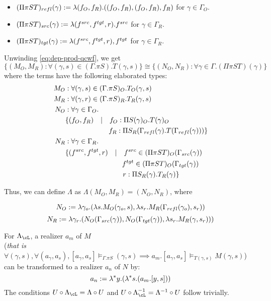 \documentclass[12pt,a4paper]{article}
\def\src{_{src}}
\def\rfl{_{refl}}
\def\tgt{_{tgt}}
\renewcommand{\O}{_{O}}\alwaysmath{O}
\newcommand{\R}{\ensuremath{_{R}}}
\begin{document}
\begin{itemize}
    \item $(\Pi \pi S T)\rfl(\gamma) \define \lambda (f\O, f\R). ((f\O, f\R), (f\O, f\R), f\R) $ for $\gamma \in \Gamma\O$.
    
    \item $(\Pi \pi S T)\src(\gamma) \define \lambda (f^{src}, f^{tgt}, r). f^{src}$ for $\gamma \in \Gamma\R$.
    
    \item $(\Pi \pi S T)\tgt(\gamma) \define \lambda (f^{src}, f^{tgt}, r), f^{tgt}$ for $\gamma \in \Gamma\R$.
\end{itemize}

Unwinding \cref{eq:dep-prod-qcwf}, we get  
$$\{(M\O,M\R) : \forall (\gamma, s) \in (\Gamma. \pi S) . T(\gamma, s) \} \cong \{(N\O, N\R) : \forall \gamma \in \Gamma . (\Pi \pi S T)(\gamma)\}$$
where the terms have the following elaborated types:
\begin{align*}
  M\O &: \forall (\gamma, s) \in (\Gamma. \pi S)\O . T\O(\gamma, s) \\
  M\R &: \forall (\gamma, r) \in (\Gamma. \pi S)\R . T\R(\gamma, s) \\
  N\O &: \forall \gamma \in \Gamma\O .\\
  &\{ (f\O , f\R) \quad|\quad f\O : \Pi S(\gamma)\O.T(\gamma)\O\\
  &\hspace{6.2em}  f\R : \Pi S\R (\Gamma\rfl(\gamma).T(\Gamma\rfl(\gamma))) \} \\
  N\R &: \forall \gamma \in \Gamma\R.\\
  &\{ (f^{src}, f^{tgt} , r) \quad|\quad  f^{src} \in (\Pi \pi S T)\O(\Gamma\src(\gamma))\\
  &\hspace{8.1em}   f^{tgt} \in (\Pi \pi S T)\O(\Gamma\tgt(\gamma))\\
  &\hspace{8.2em}   r : \Pi S\R (\gamma).T\R(\gamma)\}
\end{align*}

Thus, we can define $\Lambda$ as $\Lambda(M\O,M\R) = (N\O, N\R)$, where

$$N\O \define \lambda \gamma_o . (\lambda s. M\O(\gamma_o, s), \lambda s_r. M\R(\Gamma\rfl(\gamma_o), s_r))$$
$$N\R \define \lambda \gamma_r . ( N\O(\Gamma\src(\gamma)), N\O(\Gamma\tgt(\gamma)),  \lambda s_r. M\R(\gamma, s_r)) )$$

For $\Lambda_\cL$, a realizer $a_m$ of $M$\\
(\textit{that is } $\mathit{\forall (\gamma,s), \forall (a_\gamma, a_s), [a_\gamma, a_s] \vDash_{\Gamma. \pi S} (\gamma,s) \implies a_m. [a_\gamma, a_s] \vDash_{T(\gamma,s)} M(\gamma,s)}$)\\
can be transformed to a realizer $a_n$ of $N$ by:
$$a_n := \lambda^* y. (\lambda^* s . (a_m . [y, s]))$$ 
The conditions $U \comp \Lambda_\cL = \Lambda \comp U$ and $U \comp \Lambda^{-1}_\cL = \Lambda^{-1}\comp U$ follow trivially.
\end{document}
